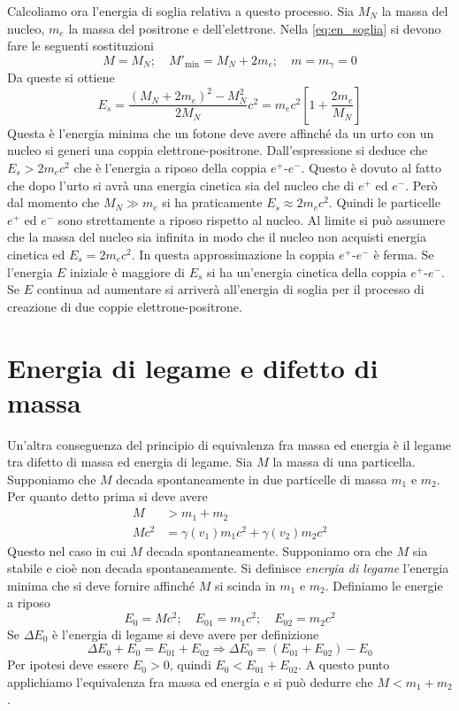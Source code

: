 Calcoliamo ora l'energia di soglia relativa a questo processo. Sia $M_N$ la 
massa del nucleo, $m_e$ la massa del positrone e dell'elettrone. Nella 
\eqref{eq:en_soglia} si devono fare le seguenti sostituzioni
\[
M = M_N;\quad M'_\text{min} = M_N + 2m_e;\quad m = m_\gamma = 0
\]
Da queste si ottiene
\begin{equation}
 E_s = \frac{(M_N + 2m_e)^2 - M_N^2}{2M_N}c^2 = 
m_ec^2\left[1+\frac{2m_e}{M_N}\right]
\end{equation}
Questa è l'energia minima che un fotone deve avere affinché da un urto con un 
nucleo si generi una coppia elettrone-positrone. Dall'espressione si deduce che 
$E_s > 2m_ec^2$ che è l'energia a riposo della coppia $e^+$-$e^-$. Questo è 
dovuto al fatto che dopo l'urto si avrà una energia cinetica sia del nucleo 
che di $e^+$ ed $e^-$. Però dal momento che $M_N\gg m_e$ si ha praticamente 
$E_s \approx 2m_ec^2$. Quindi le particelle $e^+$ ed $e^-$ sono strettamente a 
riposo rispetto al nucleo. Al limite si può assumere che la massa del nucleo 
sia infinita in modo che il nucleo non acquisti energia cinetica ed $E_s = 
2m_ec^2$. In questa approssimazione la coppia $e^+$-$e^-$ è ferma. Se 
l'energia $E$ iniziale è maggiore di $E_s$ si ha un'energia cinetica della 
coppia $e^+$-$e^-$. Se $E$ continua ad aumentare si arriverà all'energia di 
soglia per il processo di creazione di due coppie elettrone-positrone.

\section{Energia di legame e difetto di massa}
Un'altra conseguenza del principio di equivalenza fra
massa ed energia è il legame tra difetto di massa ed energia di legame. Sia $M$
la massa di una particella. Supponiamo che $M$ decada spontaneamente in due
particelle di massa $m_1$ e $m_2$. Per quanto detto prima si deve avere
\begin{align*}
M &> m_1 + m_2\\
Mc^2 &= \gamma(v_1) m_1c^2 + \gamma(v_2) m_2c^2
\end{align*}
Questo nel caso in cui $M$ decada spontaneamente. Supponiamo ora che $M$ sia
stabile e cioè non decada spontaneamente. Si definisce \textit{energia di
legame} l'energia minima che si deve fornire affinché $M$ si scinda in $m_1$ e
$m_2$. Definiamo le energie a riposo
\begin{equation}
 E_0 = Mc^2;\quad E_{01} = m_1c^2; \quad E_{02} = m_2c^2
\end{equation}
Se $\Delta E_0$ è l'energia di legame si deve avere per definizione
\begin{equation}
\Delta E_0 + E_0 = E_{01} + E_{02} \Rightarrow \Delta E_0 = (E_{01} + E_{02}) - 
E_0
\end{equation}
Per ipotesi deve essere $E_0 > 0$, quindi $E_0 < E_{01} + E_{02}$. A questo
punto applichiamo l'equivalenza fra massa ed energia e si può dedurre che $M <
m_1 + m_2$.

